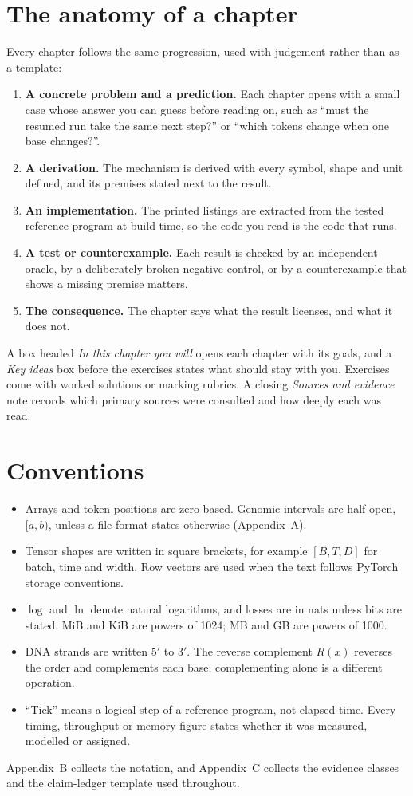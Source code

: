 \section*{The anatomy of a chapter}
Every chapter follows the same progression, used with judgement rather than as a
template:
\begin{enumerate}
\item \textbf{A concrete problem and a prediction.} Each chapter opens with a small case
whose answer you can guess before reading on, such as ``must the resumed run take the same
next step?'' or ``which tokens change when one base changes?''.
\item \textbf{A derivation.} The mechanism is derived with every symbol, shape and unit
defined, and its premises stated next to the result.
\item \textbf{An implementation.} The printed listings are extracted from the tested
reference program at build time, so the code you read is the code that runs.
\item \textbf{A test or counterexample.} Each result is checked by an independent oracle,
by a deliberately broken negative control, or by a counterexample that shows a missing
premise matters.
\item \textbf{The consequence.} The chapter says what the result licenses, and what it
does not.
\end{enumerate}
A box headed \emph{In this chapter you will} opens each chapter with its goals, and a
\emph{Key ideas} box before the exercises states what should stay with you. Exercises come with worked
solutions or marking rubrics. A closing \emph{Sources and evidence} note records which
primary sources were consulted and how deeply each was read.

\section*{Conventions}
\begin{itemize}
\setlength{\itemsep}{1pt}
\item Arrays and token positions are zero-based. Genomic intervals are half-open,
$[a,b)$, unless a file format states otherwise (Appendix~A).
\item Tensor shapes are written in square brackets, for example $[B,T,D]$ for batch,
time and width. Row vectors are used when the text follows PyTorch storage conventions.
\item $\log$ and $\ln$ denote natural logarithms, and losses are in nats unless bits are
stated. MiB and KiB are powers of 1024; MB and GB are powers of 1000.
\item DNA strands are written $5'$ to $3'$. The reverse complement $R(x)$ reverses the
order and complements each base; complementing alone is a different operation.
\item ``Tick'' means a logical step of a reference program, not elapsed time. Every
timing, throughput or memory figure states whether it was measured, modelled or
assigned.
\end{itemize}
Appendix~B collects the notation, and Appendix~C collects the evidence classes and the
claim-ledger template used throughout.

